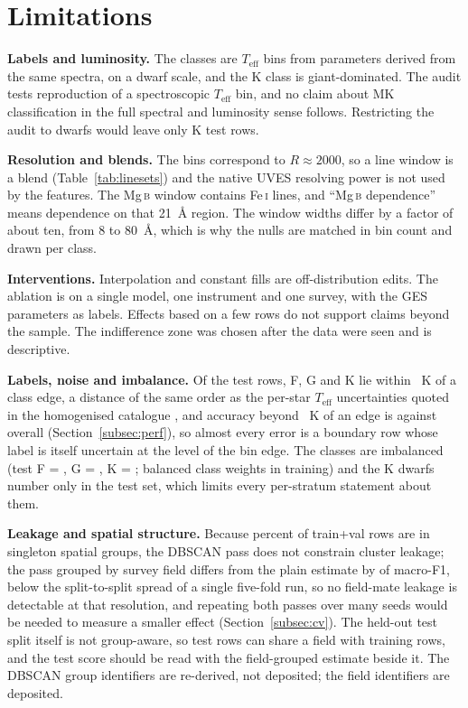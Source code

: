 \documentclass[11pt,a4paper]{article}
\newcommand{\Mgb}{Mg\,\textsc{b}\xspace}
\newcommand{\FeI}{Fe\,\textsc{i}\xspace}
\newcommand{\Teff}{$T_{\mathrm{eff}}$\xspace}
\begin{document}
\section{Limitations}
\label{sec:limitations}

\textbf{Labels and luminosity.} The classes are \Teff bins from parameters derived from the same spectra, on a dwarf scale, and the K class is giant-dominated. The audit tests reproduction of a spectroscopic \Teff bin, and no claim about MK classification in the full spectral and luminosity sense follows. Restricting the audit to dwarfs would leave only \lumNDwarfKtest{} K test rows.

\textbf{Resolution and blends.} The bins correspond to $R \approx 2000$, so a line window is a blend (Table~\ref{tab:linesets}) and the native UVES resolving power is not used by the features. The \Mgb window contains \FeI lines, and ``\Mgb dependence'' means dependence on that 21~\AA{} region. The window widths differ by a factor of about ten, from 8 to 80~\AA, which is why the nulls are matched in bin count and drawn per class.

\textbf{Interventions.} Interpolation and constant fills are off-distribution edits. The ablation is on a single model, one instrument and one survey, with the GES parameters as labels. Effects based on a few rows do not support claims beyond the sample. The indifference zone was chosen after the data were seen and is descriptive.

\textbf{Labels, noise and imbalance.} Of the test rows, \bdNearF{} F, \bdNearG{} G and \bdNearK{} K lie within \bdCut~K of a class edge, a distance of the same order as the per-star \Teff uncertainties quoted in the homogenised catalogue \citep{2023A&A...676A.129H}, and accuracy beyond \bdThresh~K of an edge is \bdFiltAcc{} against \bdFullAcc{} overall (Section~\ref{subsec:perf}), so almost every error is a boundary row whose label is itself uncertain at the level of the bin edge. The classes are imbalanced (test F = \nClassF, G = \nClassG, K = \nClassK; balanced class weights in training) and the K dwarfs number only \lumNDwarfKtest{} in the test set, which limits every per-stratum statement about them.

\textbf{Leakage and spatial structure.} Because \singRowPct{} percent of train+val rows are in singleton spatial groups, the DBSCAN pass does not constrain cluster leakage; the pass grouped by survey field differs from the plain estimate by \cvFldGapPlain{} of macro-F1, below the \cvGap{} split-to-split spread of a single five-fold run, so no field-mate leakage is detectable at that resolution, and repeating both passes over many seeds would be needed to measure a smaller effect (Section~\ref{subsec:cv}). The held-out test split itself is not group-aware, so test rows can share a field with training rows, and the test score should be read with the field-grouped estimate beside it. The DBSCAN group identifiers are re-derived, not deposited; the field identifiers are deposited.
\end{document}
